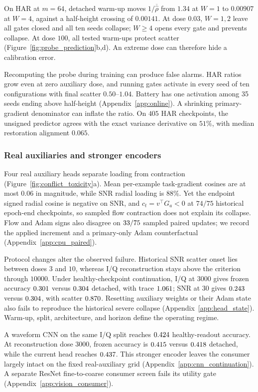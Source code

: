 On HAR at $m=64$, detached warm-up moves $1/\overline{\hat\rho}$ from $1.34$ at $W=1$ to $0.00907$ at $W=4$, against a half-height crossing of $0.00141$. At dose $0.03$, $W=1,2$ leave all gates closed and all ten seeds collapse; $W\ge4$ opens every gate and prevents collapse. At dose $100$, all tested warm-ups protect scatter (Figure~\ref{fig:probe_prediction}b,d). An extreme dose can therefore hide a calibration error.

Recomputing the probe during training can produce false alarms. HAR ratios grow even at zero auxiliary dose, and running gates activate in every seed of ten configurations with final scatter $0.50$--$1.04$. Battery has one activation among 35 seeds ending above half-height (Appendix~\ref{app:online}). A shrinking primary-gradient denominator can inflate the ratio. On $405$ HAR checkpoints, the unsigned predictor agrees with the exact variance derivative on $51\%$, with median restoration alignment $0.065$.

\subsubsection{Real auxiliaries and stronger encoders}

Four real auxiliary heads separate loading from contraction (Figure~\ref{fig:conflict_toxicity}a). Mean per-example task-gradient cosines are at most $0.06$ in magnitude, while SNR radial loading is $88\%$. Yet the endpoint signed radial cosine is negative on SNR, and $c_t=v^\top G_a<0$ at $74/75$ historical epoch-end checkpoints, so sampled flow contraction does not explain its collapse. Flow and Adam signs also disagree on $33/75$ sampled paired updates; we record the applied increment and a primary-only Adam counterfactual (Appendix~\ref{app:cpu_paired}).

Protocol changes alter the observed failure. Historical SNR scatter onset lies between doses $3$ and $10$, whereas I/Q reconstruction stays above the criterion through $10000$. Under healthy-checkpoint continuation, I/Q at $3000$ gives frozen accuracy $0.301$ versus $0.304$ detached, with trace $1.061$; SNR at $30$ gives $0.243$ versus $0.304$, with scatter $0.870$. Resetting auxiliary weights or their Adam state also fails to reproduce the historical severe collapse (Appendix~\ref{app:head_state}). Warm-up, split, architecture, and horizon define the operating regime.

A waveform CNN on the same I/Q split reaches $0.424$ healthy-readout accuracy. At reconstruction dose $3000$, frozen accuracy is $0.415$ versus $0.418$ detached, while the current head reaches $0.437$. This stronger encoder leaves the consumer largely intact on the fixed real-auxiliary grid (Appendix~\ref{app:cnn_continuation}). A separate ResNet fine-to-coarse consumer screen fails its utility gate (Appendix~\ref{app:vision_consumer}).

